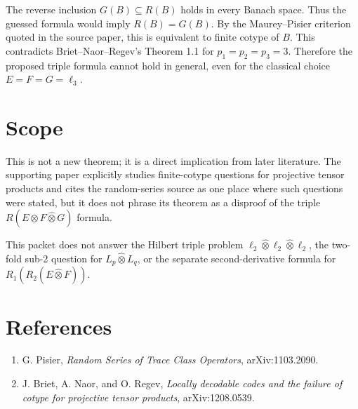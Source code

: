 \documentclass[11pt]{article}
\newcommand{\whotimes}{\widehat{\otimes}}
\begin{document}
The reverse inclusion $G(B)\subseteq R(B)$ holds in every Banach space. Thus
the guessed formula would imply $R(B)=G(B)$. By the Maurey--Pisier criterion
quoted in the source paper, this is equivalent to finite cotype of $B$.
This contradicts Briet--Naor--Regev's Theorem 1.1 for $p_1=p_2=p_3=3$.
Therefore the proposed triple formula cannot hold in general, even for the
classical choice $E=F=G=\ell_3$.

\section*{Scope}

This is not a new theorem; it is a direct implication from later literature.
The supporting paper explicitly studies finite-cotype questions for projective
tensor products and cites the random-series source as one place where such
questions were stated, but it does not phrase its theorem as a disproof of the
triple $R(E\whotimes F\whotimes G)$ formula.

This packet does not answer the Hilbert triple problem
$\ell_2\whotimes\ell_2\whotimes\ell_2$, the two-fold sub-2 question for
$L_p\whotimes L_q$, or the separate second-derivative formula for
$R_1(R_2(E\whotimes F))$.

\section*{References}

\begin{enumerate}
\item G. Pisier, \emph{Random Series of Trace Class Operators},
arXiv:1103.2090.
\item J. Briet, A. Naor, and O. Regev, \emph{Locally decodable codes and the
failure of cotype for projective tensor products}, arXiv:1208.0539.
\end{enumerate}
\end{document}
